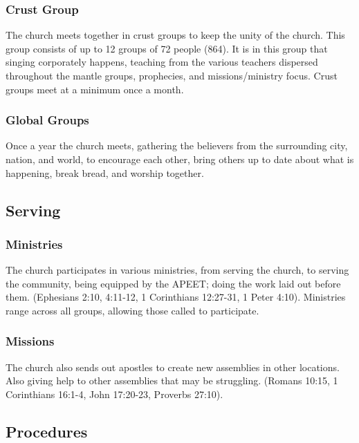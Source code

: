 \subsubsection{Crust Group}

The church meets together in crust groups to keep the unity of the church. This group consists of up to 12 groups of 72 people (864). It is in this group that singing corporately happens, teaching from the various teachers dispersed throughout the mantle groups, prophecies, and missions/ministry focus. Crust groups meet at a minimum once a month.



\subsubsection{Global Groups}

Once a year the church meets, gathering the believers from the surrounding city, nation, and world, to encourage each other, bring others up to date about what is happening, break bread, and worship together.



\subsection{Serving}



\subsubsection{Ministries}

The church participates in various ministries, from serving the church, to serving the community, being equipped by the APEET; doing the work laid out before them. (Ephesians 2:10, 4:11-12, 1 Corinthians 12:27-31, 1 Peter 4:10). Ministries range across all groups, allowing those called to participate.



\subsubsection{Missions}

The church also sends out apostles to create new assemblies in other locations. Also giving help to other assemblies that may be struggling. (Romans 10:15, 1 Corinthians 16:1-4, John 17:20-23, Proverbs 27:10).



\subsection{Procedures}



